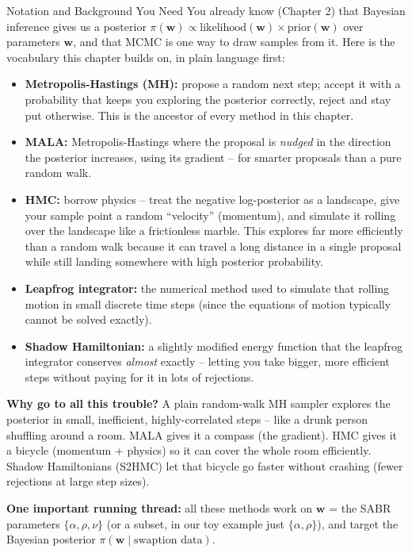 \documentclass[aspectratio=169,10pt]{beamer}
\newcommand{\bw}{\mathbf{w}}
\begin{document}
\begin{frame}[allowframebreaks]{Notation and Background You Need}
  You already know (Chapter 2) that Bayesian inference gives us a posterior
  $\pi(\bw) \propto \text{likelihood}(\bw) \times \text{prior}(\bw)$ over
  parameters $\bw$, and that MCMC is one way to draw samples from it. Here is
  the vocabulary this chapter builds on, in plain language first:

  \begin{itemize}
    \item \textbf{Metropolis-Hastings (MH):} propose a random next step;
      accept it with a probability that keeps you exploring the posterior
      correctly, reject and stay put otherwise. This is the ancestor of every
      method in this chapter.
    \item \textbf{MALA:} Metropolis-Hastings where the proposal is
      \emph{nudged} in the direction the posterior increases, using its
      gradient -- for smarter proposals than a pure random walk.
    \item \textbf{HMC:} borrow physics -- treat the negative log-posterior as
      a landscape, give your sample point a random ``velocity'' (momentum),
      and simulate it rolling over the landscape like a frictionless marble.
      This explores far more efficiently than a random walk because it can
      travel a long distance in a single proposal while still landing
      somewhere with high posterior probability.
    \item \textbf{Leapfrog integrator:} the numerical method used to
      simulate that rolling motion in small discrete time steps (since the
      equations of motion typically cannot be solved exactly).
    \item \textbf{Shadow Hamiltonian:} a slightly modified energy function
      that the leapfrog integrator conserves \emph{almost} exactly -- letting
      you take bigger, more efficient steps without paying for it in lots of
      rejections.
  \end{itemize}

  \framebreak

  \textbf{Why go to all this trouble?} A plain random-walk MH sampler explores
  the posterior in small, inefficient, highly-correlated steps -- like a drunk
  person shuffling around a room. MALA gives it a compass (the gradient).
  HMC gives it a bicycle (momentum + physics) so it can cover the whole room
  efficiently. Shadow Hamiltonians (S2HMC) let that bicycle go faster without
  crashing (fewer rejections at large step sizes).

  \vspace{2mm}
  \textbf{One important running thread:} all these methods work on
  $\bw$ = the SABR parameters $\{\alpha,\rho,\nu\}$ (or a subset, in our toy
  example just $\{\alpha,\rho\}$), and target the Bayesian posterior
  $\pi(\bw \mid \text{swaption data})$.
\end{frame}
\end{document}
